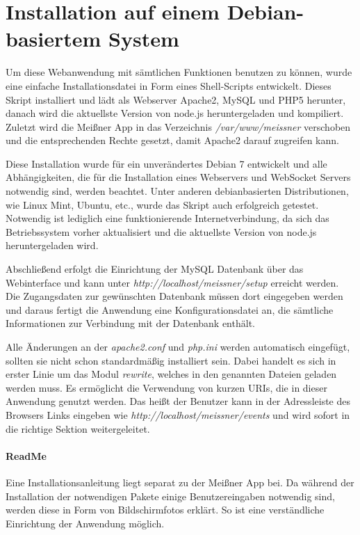 \newpage
\section{Installation auf einem Debian-basiertem System}
Um diese Webanwendung mit sämtlichen Funktionen benutzen zu können, wurde eine einfache Installationsdatei in Form eines Shell-Scripts entwickelt. Dieses Skript installiert und lädt als Webserver Apache2, MySQL und PHP5 herunter, danach wird die aktuellste Version von node.js heruntergeladen und kompiliert. Zuletzt wird die Meißner App in das Verzeichnis \emph{/var/www/meissner} verschoben und die entsprechenden Rechte gesetzt, damit Apache2 darauf zugreifen kann.\par

Diese Installation wurde für ein unverändertes Debian 7 entwickelt und alle Abhängigkeiten, die für die Installation eines Webservers und WebSocket Servers notwendig sind, werden beachtet. Unter anderen debianbasierten Distributionen, wie Linux Mint, Ubuntu, etc., wurde das Skript auch erfolgreich getestet. Notwendig ist lediglich eine funktionierende Internetverbindung, da sich das Betriebssystem vorher aktualisiert und die aktuellste Version von node.js heruntergeladen wird.\par

Abschließend erfolgt die Einrichtung der MySQL Datenbank über das Webinterface und kann unter \emph{http://localhost/meissner/setup} erreicht werden. Die Zugangsdaten zur gewünschten Datenbank müssen dort eingegeben werden und daraus fertigt die Anwendung eine Konfigurationsdatei an, die sämtliche Informationen zur Verbindung mit der Datenbank enthält.\par

Alle Änderungen an der \emph{apache2.conf} und \emph{php.ini} werden automatisch eingefügt, sollten sie nicht schon standardmäßig installiert sein. Dabei handelt es sich in erster Linie um das Modul \emph{rewrite}, welches in den genannten Dateien geladen werden muss. Es ermöglicht die Verwendung von kurzen URIs, die in dieser Anwendung genutzt werden. Das heißt der Benutzer kann in der Adressleiste des Browsers Links eingeben wie \emph{http://localhost/meissner/events} und wird sofort in die richtige Sektion weitergeleitet.

\paragraph{ReadMe}
Eine Installationsanleitung liegt separat zu der Meißner App bei. Da während der Installation der notwendigen Pakete einige Benutzereingaben notwendig sind, werden diese in Form von Bildschirmfotos erklärt. So ist eine verständliche Einrichtung der Anwendung möglich.

